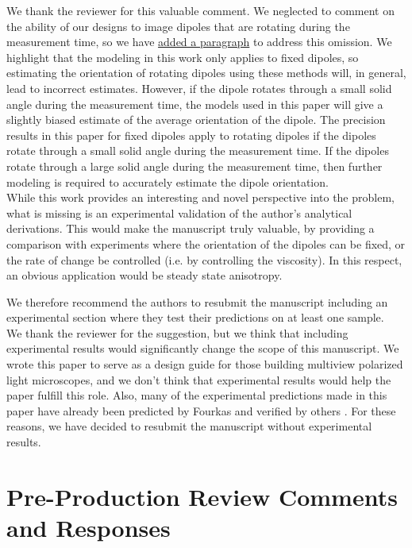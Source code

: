 \documentclass[10pt]{article}
\begin{document}
We thank the reviewer for this valuable comment. We neglected to comment on the
ability of our designs to image dipoles that are rotating during the measurement
time, so we have \hyperlink{temporal}{\color{urlblue} added a paragraph} to
address this omission. We highlight that the modeling in this work only applies
to fixed dipoles, so estimating the orientation of rotating dipoles using these
methods will, in general, lead to incorrect estimates. However, if the dipole
rotates through a small solid angle during the measurement time, the models used
in this paper will give a slightly biased estimate of the average orientation of
the dipole. The precision results in this paper for fixed dipoles apply to
rotating dipoles if the dipoles rotate through a small solid angle during the
measurement time. If the dipoles rotate through a large solid angle during the
measurement time, then further modeling is required to
accurately estimate the dipole orientation.\\

{\color{OE} While this work provides an interesting and novel perspective into
  the problem, what is missing is an experimental validation of the author's
  analytical derivations. This would make the manuscript truly valuable, by
  providing a comparison with experiments where the orientation of the dipoles
  can be fixed, or the rate of change be controlled (i.e. by controlling the
  viscosity). In this respect, an obvious application would be steady state
  anisotropy.}

{\color{OE} We therefore recommend the authors to resubmit the manuscript
  including an experimental section where they test their predictions on at
  least one sample.}\\

We thank the reviewer for the suggestion, but we think that including
experimental results would significantly change the scope of this manuscript. We
wrote this paper to serve as a design guide for those building multiview
polarized light microscopes, and we don't think that experimental results would
help the paper fulfill this role. Also, many of the experimental predictions
made in this paper have already been predicted by Fourkas \cite{fourkas2001} and
verified by others \cite{lu2008}. For these reasons, we have decided to resubmit
the manuscript without experimental results.

\section*{Pre-Production Review Comments and Responses}
\end{document}

